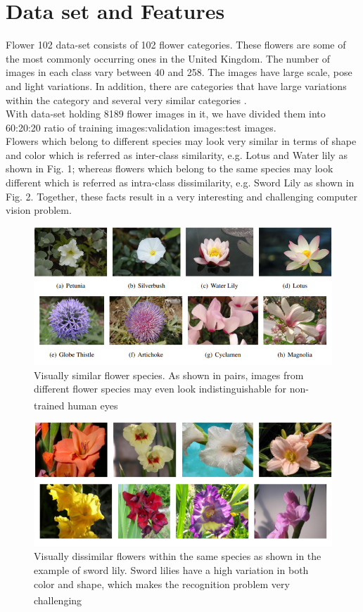 \documentclass[a4paper,19pt]{article}
\begin{document}
\section{Data set and Features}
Flower 102 data-set consists of 102 flower categories. These flowers are some of the most commonly occurring ones in the United Kingdom. The number of images in each class vary between 40 and 258. The images have large scale, pose and light variations.\cite{Oxford} In addition, there are categories that have large variations within the category and several very similar categories\cite{4756141} .
\\With data-set holding 8189 flower images in it, we have divided them into 60:20:20 ratio of training images:validation images:test images.
\\Flowers which belong to different species may look very similar in terms of shape and color which is referred as inter-class similarity, e.g. Lotus and Water lily as shown in Fig. 1; whereas flowers which belong to the same species may look different which is referred as intra-class dissimilarity, e.g. Sword Lily as shown in Fig. 2. Together, these facts result in a very interesting and challenging computer vision problem.

\begin{figure}[h!]
\centering
\includegraphics[scale=0.6]{images/flowerclass.PNG}
\caption{Visually similar flower species. As shown in pairs, images from different flower species may even look indistinguishable for non-trained human eyes\textsuperscript{\cite{Oxford}}}
\label{fig:flower similar class}
\end{figure}

\begin{figure}[h!]
\centering
\includegraphics[scale=0.6]{images/disimilar.PNG}
\caption{Visually dissimilar flowers within the same species as shown in the example of sword lily. Sword lilies have a high variation in both color and shape, which makes the recognition problem very challenging \textsuperscript{\cite{Oxford}}}
\label{fig:flower dissimlar class}
\end{figure}
\end{document}
